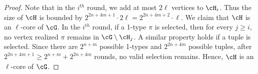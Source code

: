 \begin{proof}
    Note that in the $i^{th}$ round, we add at most $2\ell$ vertices to $\cH_i$.
    Thus the size of $\cH$ is bounded by $2^{2n+4m+1} \cdot 2\ell = 2^{2n+4m+2} \cdot \ell$.
    We claim that $\cH$ is an $\ell$-core of $\cG$.
    In the $i^{th}$ round, if a 1-type $\pi$ is selected,
    then for every $j \ge i$,
    no vertex realized $\pi$ remains in $\cG \setminus \cH_j$.
    A similar property holds if a tuple is selected.
    Since there are $2^{n+m}$ possible 1-types and $2^{2n+4m}$ possible tuples,
    after $2^{2n+4m+1} \ge 2^{n+m} + 2^{2n+4m}$ rounds,
    no valid selection remains.
    Hence, $\cH$ is an $\ell$-core of $\cG$.
\end{proof}